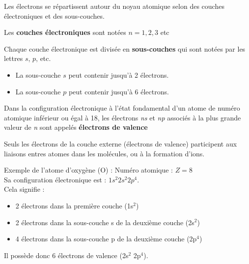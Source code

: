 \documentclass{article}
\begin{document}
\begin{tcolorbox}[colback=green!10!white, colframe=green!75!black, title=Définitions : ]
  Les électrons se répartissent autour du noyau atomique selon des couches électroniques et des sous-couches. \par 
  \vspace{1em}
  Les \textbf{couches électroniques} sont notées \(n = 1, 2, 3\) etc \par 
  Chaque couche électronique est divisée en \textbf{sous-couches} qui sont notées par les lettres \(s\), \(p\), etc.
  \begin{itemize}[noitemsep]
    \item La sous-couche \(s\) peut contenir jusqu'à 2 électrons.
    \item La sous-couche \(p\) peut contenir jusqu'à 6 électrons.
  \end{itemize}

  Dans la configuration électronique à l'état fondamental d'un atome de numéro atomique inférieur ou égal à 18, les électrons \textit{ns} et \textit{np} associés à la plus grande valeur de \textit{n} sont appelés \textbf{électrons de valence}
  
  Seuls les électrons de la couche externe (électrons de valence) participent aux liaisons entres atomes dans les molécules, ou à la formation d'ions. 
  
\end{tcolorbox}

\begin{tcolorbox}[colback=blue!10!white, colframe=blue!75!black, title=Application : Structure électronique]
  Exemple de l'atome d'oxygène (O) : Numéro atomique : \(Z = 8\) \\
  Sa configuration électronique est : \(1s^2 2s^2 2p^4\). \\
  Cela signifie :
  \begin{itemize}[noitemsep]
    \item 2 électrons dans la première couche (1s$^2$)
    \item 2 électrons dans la sous-couche s de la deuxième couche (2s$^2$)
    \item 4 électrons dans la sous-couche p de la deuxième couche (2p$^4$)
  \end{itemize}
  Il possède donc 6 électrons de valence (2s$^2$ 2p$^4$).
\end{tcolorbox}

\vspace{1em}
\end{document}
